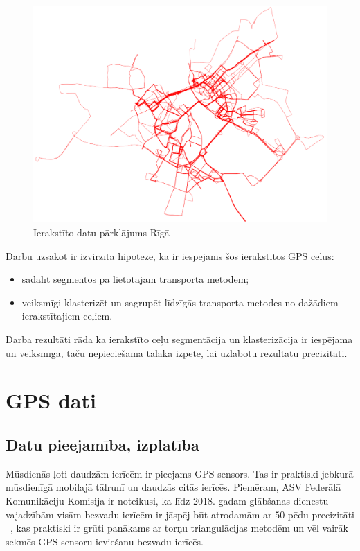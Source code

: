 \documentclass{ludis}
\begin{document}
\begin{figure}
  \centering
  \includegraphics[scale=0.5]{img/all_trails}
  \caption{Ierakstīto datu pārklājums Rīgā}
  \label{fig:all_trails}
\end{figure}

Darbu uzsākot ir izvirzīta hipotēze, ka ir iespējams šos ierakstītos GPS ceļus:
\begin{itemize}
\item sadalīt segmentos pa lietotajām transporta metodēm;
\item veiksmīgi klasterizēt un sagrupēt līdzīgās transporta metodes no dažādiem ierakstītajiem ceļiem.
\end{itemize}


Darba rezultāti rāda ka ierakstīto ceļu segmentācija un klasterizācija ir iespējama un veiksmīga,
taču nepieciešama tālāka izpēte, lai uzlabotu rezultātu precizitāti.

\chapter{GPS dati}
\section{Datu pieejamība, izplatība}
Mūsdienās ļoti daudzām ierīcēm ir pieejams GPS sensors. Tas ir praktiski jebkurā mūsdienīgā mobilajā
tālrunī un daudzās citās ierīcēs. Piemēram, ASV Federālā Komunikāciju Komisija ir noteikusi, ka līdz
2018. gadam glābšanas dienestu vajadzībām visām bezvadu ierīcēm ir jāspēj būt atrodamām 
ar $50$ pēdu precizitāti ~\cite{fcc_e911}, kas praktiski ir grūti panākams ar torņu triangulācijas 
metodēm un vēl vairāk sekmēs GPS sensoru ieviešanu bezvadu ierīcēs.
\end{document}
